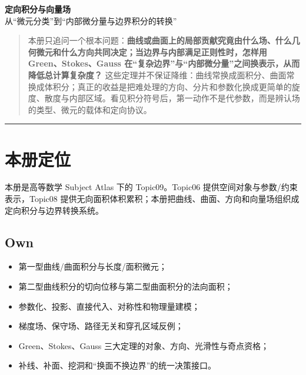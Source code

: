 \documentclass[11pt,a4paper,fontset=fandol]{ctexart}
\begin{document}
\begin{center}
{\LARGE\textbf{定向积分与向量场}}\\[0.4em]
{\large 从“微元分类”到“内部微分量与边界积分的转换”}
\end{center}
\vspace{0.5em}

\begin{quote}
本册只追问一个根本问题：\textbf{曲线或曲面上的局部贡献究竟由什么场、什么几何微元和什么方向共同决定；当边界与内部满足正则性时，怎样用 Green、Stokes、Gauss 在“复杂边界”与“内部微分量”之间换表示，从而降低总计算复杂度？} 这些定理并不保证降维：曲线常换成面积分、曲面常换成体积分；真正的收益是把难处理的方向、分片和参数化换成更简单的旋度、散度与内部区域。看见积分符号后，第一动作不是代参数，而是辨认场的类型、微元的载体和定向协议。
\end{quote}

\begin{center}\rule{0.5\linewidth}{0.5pt}\end{center}

\setcounter{section}{-1}
\section{本册定位}

本册是高等数学 Subject Atlas 下的 Topic09。Topic06 提供空间对象与参数/约束表示，Topic08 提供无向面积体积累积；本册把曲线、曲面、方向和向量场组织成定向积分与边界转换系统。

\subsection{Own}
\begin{itemize}
  \item 第一型曲线/曲面积分与长度/面积微元；
  \item 第二型曲线积分的切向位移与第二型曲面积分的法向面积；
  \item 参数化、投影、直接代入、对称性和物理量建模；
  \item 梯度场、保守场、路径无关和穿孔区域反例；
  \item Green、Stokes、Gauss 三大定理的对象、方向、光滑性与奇点资格；
  \item 补线、补面、挖洞和“换面不换边界”的统一决策接口。
\end{itemize}
\end{document}
